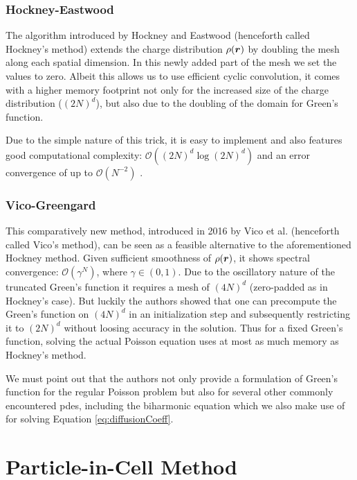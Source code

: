 \subsubsection{Hockney-Eastwood}
\label{subsection:hockney}

The algorithm introduced by Hockney and Eastwood \cite{Hockney2021} (henceforth called Hockney's
method) extends the charge distribution $\rho(\boldsymbol{r})$ by doubling the mesh along each spatial dimension.
In this newly added part of the mesh we set the values to zero. Albeit this allows us to 
use efficient cyclic convolution, it comes with a higher memory
footprint not only for the increased size of the charge distribution ($(2N)^d$), but also due to the
doubling of the domain for Green's function.

Due to the simple nature of this trick, it is easy to implement and also features good
computational complexity: $\mathcal{O}((2N)^d \log(2N)^d )$ and an error convergence of up to
$\mathcal O(N^{-2})$ \cite{zou2021fft}.

\subsubsection{Vico-Greengard}
\label{subsection:vico}

This comparatively new method, introduced in 2016 \cite{vicoGreengard2016} by Vico et al.
(henceforth called Vico's method), can be seen as a feasible alternative to the aforementioned Hockney method. 
Given sufficient smoothness of $\rho(\boldsymbol{r})$, it shows spectral convergence: $\mathcal O(\gamma^N)$, where $\gamma \in (0,1)$.
Due to the oscillatory nature of the truncated Green's function it requires a mesh of $(4 N)^d$
(zero-padded as in Hockney's case). But luckily the authors showed that one can precompute the
Green's function on $(4N)^d$ in an initialization step and subsequently restricting it to $(2 N)^d$
without loosing accuracy in the solution.
Thus for a fixed Green's function, solving the actual Poisson equation uses at most as much 
memory as Hockney's method.

We must point out that the authors not only provide a formulation of Green's function for the
regular Poisson problem but also for several other commonly encountered \gls{pde}s, including the
biharmonic equation which we also make use of for solving Equation \ref{eq:diffusionCoeff}.

\section{Particle-in-Cell Method}
\label{section:PIC_method}

